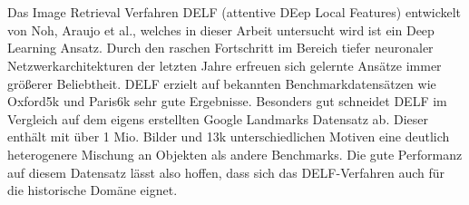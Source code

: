 \\\\
Das Image Retrieval Verfahren DELF (attentive DEep Local Features) \cite{delf} entwickelt von Noh, \mbox{Araujo} et al., welches in dieser Arbeit untersucht wird ist ein Deep Learning Ansatz. Durch den raschen Fortschritt im Bereich tiefer neuronaler Netzwerkarchitekturen der letzten Jahre erfreuen sich gelernte Ansätze immer größerer Beliebtheit. DELF erzielt auf bekannten Benchmarkdatensätzen wie Oxford5k \cite{oxford5k} und Paris6k \cite{paris6k} sehr gute Ergebnisse. Besonders gut schneidet DELF im Vergleich auf dem eigens erstellten Google Landmarks Datensatz \cite{landmarks} ab. Dieser enthält mit über 1 Mio. Bilder und 13k unterschiedlichen Motiven eine deutlich heterogenere Mischung an Objekten als andere Benchmarks. Die gute Performanz auf diesem Datensatz lässt also hoffen, dass sich das DELF-Verfahren auch für die historische Domäne eignet.


